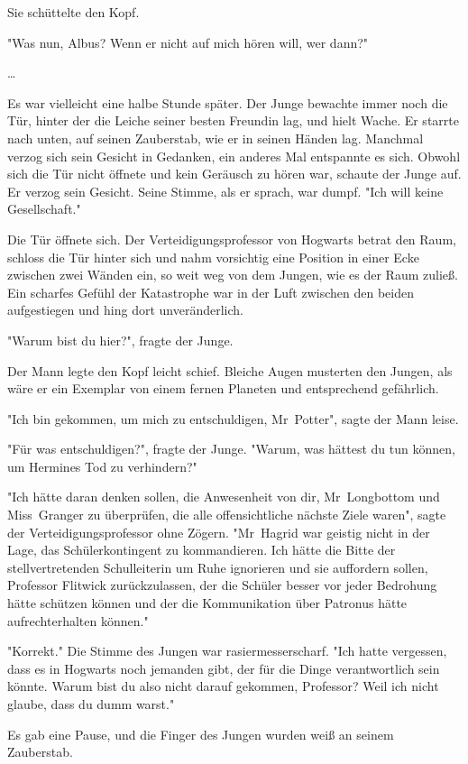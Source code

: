 {Sie schüttelte den Kopf.

"Was nun, Albus? Wenn er nicht auf mich hören will, wer dann?"

…

Es war vielleicht eine halbe Stunde später. Der Junge bewachte immer noch die Tür, hinter der die Leiche seiner besten Freundin lag, und hielt Wache. Er starrte nach unten, auf seinen Zauberstab, wie er in seinen Händen lag. Manchmal verzog sich sein Gesicht in Gedanken, ein anderes Mal entspannte es sich. Obwohl sich die Tür nicht öffnete und kein Geräusch zu hören war, schaute der Junge auf. Er verzog sein Gesicht. Seine Stimme, als er sprach, war dumpf. "Ich will keine Gesellschaft."

Die Tür öffnete sich. Der Verteidigungsprofessor von Hogwarts betrat den Raum, schloss die Tür hinter sich und nahm vorsichtig eine Position in einer Ecke zwischen zwei Wänden ein, so weit weg von dem Jungen, wie es der Raum zuließ. Ein scharfes Gefühl der Katastrophe war in der Luft zwischen den beiden aufgestiegen und hing dort unveränderlich.

"Warum bist du hier?", fragte der Junge.

Der Mann legte den Kopf leicht schief. Bleiche Augen musterten den Jungen, als wäre er ein Exemplar von einem fernen Planeten und entsprechend gefährlich.

"Ich bin gekommen, um mich zu entschuldigen, Mr~Potter", sagte der Mann leise.

"Für was entschuldigen?", fragte der Junge. "Warum, was hättest du tun können, um Hermines Tod zu verhindern?"

"Ich hätte daran denken sollen, die Anwesenheit von dir, Mr~Longbottom und Miss~Granger zu überprüfen, die alle offensichtliche nächste Ziele waren", sagte der Verteidigungsprofessor ohne Zögern. "Mr~Hagrid war geistig nicht in der Lage, das Schülerkontingent zu kommandieren. Ich hätte die Bitte der stellvertretenden Schulleiterin um Ruhe ignorieren und sie auffordern sollen, Professor Flitwick zurückzulassen, der die Schüler besser vor jeder Bedrohung hätte schützen können und der die Kommunikation über Patronus hätte aufrechterhalten können."

"Korrekt." Die Stimme des Jungen war rasiermesserscharf. "Ich hatte vergessen, dass es in Hogwarts noch jemanden gibt, der für die Dinge verantwortlich sein könnte. Warum bist du also nicht darauf gekommen, Professor? Weil ich nicht glaube, dass du dumm warst."

Es gab eine Pause, und die Finger des Jungen wurden weiß an seinem Zauberstab.

}
